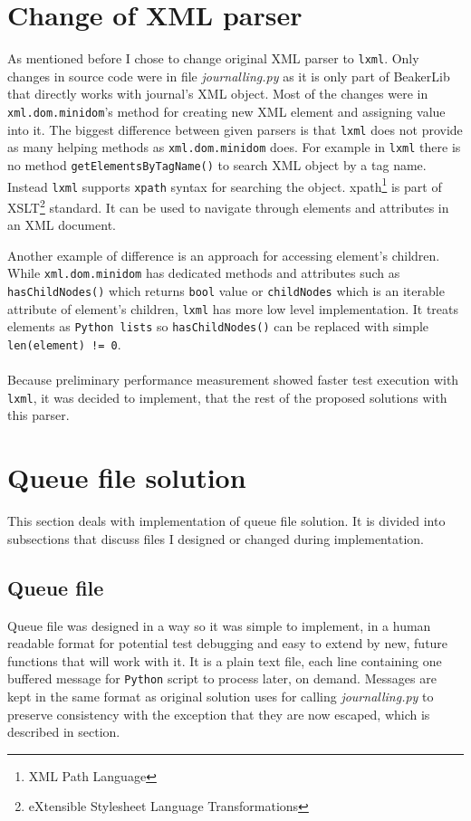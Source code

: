 \section{Change of XML parser}
As mentioned before I chose to change original XML parser to \texttt{lxml}. Only changes in source code were in file \textit{journalling.py} as it is only part of BeakerLib that directly works with journal's XML object. 
Most of the changes were in \texttt{xml.dom.minidom}'s method for creating new XML element and assigning value into it.
The biggest difference between given parsers is that \texttt{lxml} does not provide as many helping methods as \texttt{xml.dom.minidom} does.
For example in \texttt{lxml}  there is no method \texttt{getElementsByTagName()} to search XML object by a tag name. Instead \texttt{lxml} supports \texttt{xpath}\cite{xpath} syntax for searching the object. xpath\footnote{XML Path Language} is part of XSLT\footnote{eXtensible Stylesheet Language Transformations} standard. It can be used to navigate through elements and attributes in an XML document.

Another example of difference is an approach for accessing element's children. While \texttt{xml.dom.minidom} has dedicated methods and attributes such as \texttt{hasChildNodes()} which returns \texttt{bool} value or \texttt{childNodes} which is an iterable attribute of element's children, \texttt{lxml} has more low level implementation. It treats elements as \texttt{Python lists} so \texttt{hasChildNodes()} can be replaced with simple \texttt{len(element) != 0}.
\\
\\
Because preliminary performance measurement showed faster test execution with \texttt{lxml}, it was decided to implement, that the rest of the proposed solutions with this parser.

\section{Queue file solution}
This section deals with implementation of queue file solution. It is divided into subsections that discuss files I designed or changed during implementation. 

\subsection{Queue file}
Queue file was designed in a way so it was simple to implement, in a human readable format for potential test debugging and easy to extend by new, future functions that will work with it. 
It is a plain text file, each line containing one buffered message for \texttt{Python} script to process later, on demand. Messages are kept in the same format as original solution uses for calling \textit{journalling.py} to preserve consistency with the exception that they are now escaped, which is described in section.

